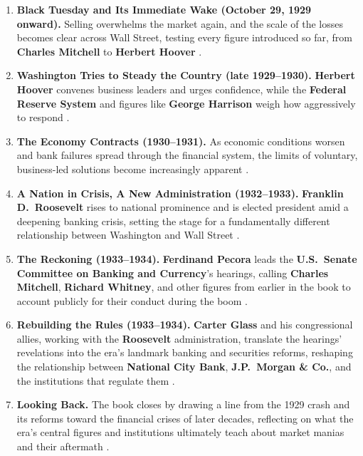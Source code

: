 \documentclass[11pt]{article}
\newcommand{\charname}[1]{\textbf{#1}}
\begin{document}
\begin{enumerate}[leftmargin=1.6em, itemsep=0.6em]
\item \textbf{Black Tuesday and Its Immediate Wake (October 29, 1929 onward).} Selling
overwhelms the market again, and the scale of the losses becomes clear across Wall
Street, testing every figure introduced so far, from \charname{Charles Mitchell} to
\charname{Herbert Hoover} \autocite{supersummary1929,csmonitor1929}.

\item \textbf{Washington Tries to Steady the Country (late 1929--1930).}
\charname{Herbert Hoover} convenes business leaders and urges confidence, while the
\charname{Federal Reserve System} and figures like \charname{George Harrison}
weigh how aggressively to respond \autocite{supersummary1929}.

\item \textbf{The Economy Contracts (1930--1931).} As economic conditions worsen and
bank failures spread through the financial system, the limits of voluntary,
business-led solutions become increasingly apparent \autocite{supersummary1929}.

\item \textbf{A Nation in Crisis, A New Administration (1932--1933).}
\charname{Franklin D.\ Roosevelt} rises to national prominence and is elected
president amid a deepening banking crisis, setting the stage for a fundamentally
different relationship between Washington and Wall Street \autocite{supersummary1929,
libraryjournal1929}.

\item \textbf{The Reckoning (1933--1934).} \charname{Ferdinand Pecora} leads the
\charname{U.S.\ Senate Committee on Banking and Currency}'s hearings, calling
\charname{Charles Mitchell}, \charname{Richard Whitney}, and other figures from
earlier in the book to account publicly for their conduct during the boom
\autocite{libraryjournal1929,dailyeconomy1929}.

\item \textbf{Rebuilding the Rules (1933--1934).} \charname{Carter Glass} and his
congressional allies, working with the \charname{Roosevelt} administration,
translate the hearings' revelations into the era's landmark banking and securities
reforms, reshaping the relationship between \charname{National City Bank},
\charname{J.P.\ Morgan \& Co.}, and the institutions that regulate them
\autocite{libraryjournal1929}.

\item \textbf{Looking Back.} The book closes by drawing a line from the 1929 crash
and its reforms toward the financial crises of later decades, reflecting on what the
era's central figures and institutions ultimately teach about market manias and
their aftermath \autocite{axios1929,dailyeconomy1929}.

\end{enumerate}

\printbibliography[title={References}]
\end{document}

